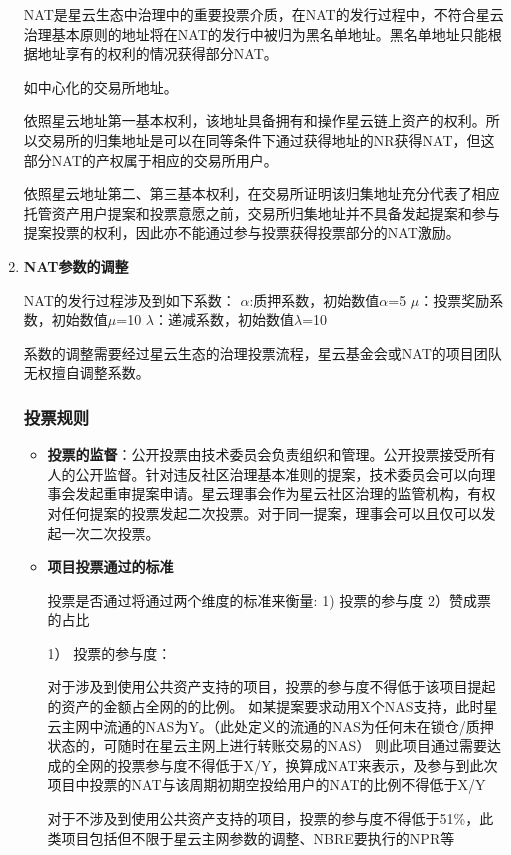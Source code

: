\begin{enumerate}
NAT是星云生态中治理中的重要投票介质，在NAT的发行过程中，不符合星云治理基本原则的地址将在NAT的发行中被归为黑名单地址。黑名单地址只能根据地址享有的权利的情况获得部分NAT。

如中心化的交易所地址。

依照星云地址第一基本权利，该地址具备拥有和操作星云链上资产的权利。所以交易所的归集地址是可以在同等条件下通过获得地址的NR获得NAT，但这部分NAT的产权属于相应的交易所用户。

依照星云地址第二、第三基本权利，在交易所证明该归集地址充分代表了相应托管资产用户提案和投票意愿之前，交易所归集地址并不具备发起提案和参与提案投票的权利，因此亦不能通过参与投票获得投票部分的NAT激励。

\item \textbf{NAT参数的调整}

	NAT的发行过程涉及到如下系数：
	$α$:质押系数，初始数值$α$=5
	$μ$：投票奖励系数，初始数值$μ$=10
	$λ$：递减系数，初始数值$λ$=10

	系数的调整需要经过星云生态的治理投票流程，星云基金会或NAT的项目团队无权擅自调整系数。

\subsubsection{投票规则}

\begin{itemize}

	\item \textbf{投票的监督}：公开投票由技术委员会负责组织和管理。公开投票接受所有人的公开监督。针对违反社区治理基本准则的提案，技术委员会可以向理事会发起重审提案申请。星云理事会作为星云社区治理的监管机构，有权对任何提案的投票发起二次投票。对于同一提案，理事会可以且仅可以发起一次二次投票。
	
	\item \textbf{项目投票通过的标准}
	
	投票是否通过将通过两个维度的标准来衡量: 1) 投票的参与度 2）赞成票的占比

	1） 投票的参与度：

	对于涉及到使用公共资产支持的项目，投票的参与度不得低于该项目提起的资产的金额占全网的的比例。
	如某提案要求动用X个NAS支持，此时星云主网中流通的NAS为Y。（此处定义的流通的NAS为任何未在锁仓/质押状态的，可随时在星云主网上进行转账交易的NAS）
	则此项目通过需要达成的全网的投票参与度不得低于X/Y，换算成NAT来表示，及参与到此次项目中投票的NAT与该周期初期空投给用户的NAT的比例不得低于X/Y

	对于不涉及到使用公共资产支持的项目，投票的参与度不得低于51\%，此类项目包括但不限于星云主网参数的调整、NBRE要执行的NPR等


\end{itemize}
\end{enumerate}
